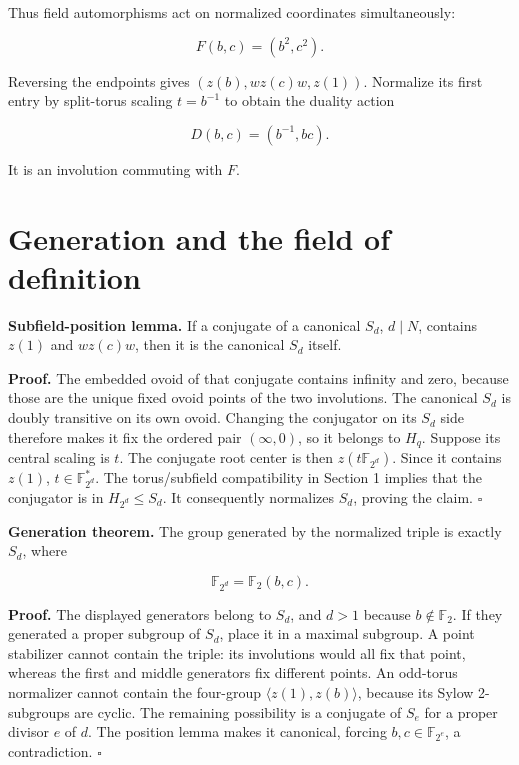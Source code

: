 Thus field automorphisms act on normalized coordinates simultaneously:

\[F(b,c)=(b^2,c^2).\]

Reversing the endpoints gives \((z(b),wz(c)w,z(1))\). Normalize its
first entry by split-torus scaling \(t=b^{-1}\) to obtain the duality
action

\[D(b,c)=(b^{-1},bc).\]

It is an involution commuting with \(F\).

\section{Generation and the field of
definition}\label{generation-and-the-field-of-definition}

\textbf{Subfield-position lemma.} If a conjugate of a canonical \(S_d\),
\(d\mid N\), contains \(z(1)\) and \(wz(c)w\), then it is the canonical
\(S_d\) itself.

\textbf{Proof.} The embedded ovoid of that conjugate contains infinity
and zero, because those are the unique fixed ovoid points of the two
involutions. The canonical \(S_d\) is doubly transitive on its own
ovoid. Changing the conjugator on its \(S_d\) side therefore makes it
fix the ordered pair \((\infty,0)\), so it belongs to \(H_q\). Suppose
its central scaling is \(t\). The conjugate root center is then
\(z(t\mathbb F_{2^d})\). Since it contains \(z(1)\),
\(t\in\mathbb F_{2^d}^*\). The torus/subfield compatibility in Section 1
implies that the conjugator is in \(H_{2^d}\le S_d\). It consequently
normalizes \(S_d\), proving the claim. \(\square\)

\textbf{Generation theorem.} The group generated by the normalized
triple is exactly \(S_d\), where

\[\mathbb F_{2^d}=\mathbb F_2(b,c).\]

\textbf{Proof.} The displayed generators belong to \(S_d\), and \(d>1\)
because \(b\notin\mathbb F_2\). If they generated a proper subgroup of
\(S_d\), place it in a maximal subgroup. A point stabilizer cannot
contain the triple: its involutions would all fix that point, whereas
the first and middle generators fix different points. An odd-torus
normalizer cannot contain the four-group \(\langle z(1),z(b)\rangle\),
because its Sylow 2-subgroups are cyclic. The remaining possibility is a
conjugate of \(S_e\) for a proper divisor \(e\) of \(d\). The position
lemma makes it canonical, forcing \(b,c\in\mathbb F_{2^e}\), a
contradiction. \(\square\)

